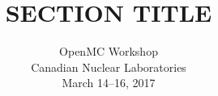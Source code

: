 \documentclass[noamssymb,svgnames]{beamer}
\title{SECTION TITLE}
\institute{\texttt{[image: ../images/openmc\_logo.png]}}
\date{OpenMC Workshop \\ Canadian Nuclear Laboratories \\ March 14--16, 2017}
\begin{document}
\frame{\titlepage}

\end{document}
